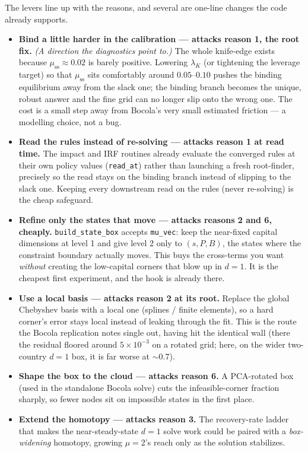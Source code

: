 \documentclass[11pt]{article}
\newcommand{\code}[1]{\texttt{#1}}
\begin{document}
The levers line up with the reasons, and several are one-line changes the
code already supports.

\begin{itemize}
\item \textbf{Bind a little harder in the calibration --- attacks reason 1,
      the root fix.} \emph{(A direction the diagnostics point to.)} The whole
      knife-edge exists because $\mu_{\text{ss}}\approx0.02$ is barely
      positive. Lowering $\lambda_K$ (or tightening the leverage target) so
      that $\mu_{\text{ss}}$ sits comfortably around $0.05$--$0.10$ pushes the
      binding equilibrium away from the slack one; the binding branch becomes
      the unique, robust answer and the fine grid can no longer slip onto the
      wrong one. The cost is a small step away from Bocola's very small
      estimated friction --- a modelling choice, not a bug.
\item \textbf{Read the rules instead of re-solving --- attacks reason 1 at
      read time.} The impact and IRF routines already evaluate the converged
      rules at their own policy values (\code{read\_at}) rather than launching
      a fresh root-finder, precisely so the read stays on the binding branch
      instead of slipping to the slack one. Keeping every downstream read on
      the rules (never re-solving) is the cheap safeguard.
\item \textbf{Refine only the states that move --- attacks reasons 2 and 6,
      cheaply.} \code{build\_state\_box} accepts \code{mu\_vec}: keep the
      near-fixed capital dimensions at level 1 and give level 2 only to
      $(s,P,B)$, the states where the constraint boundary actually moves. This
      buys the cross-terms you want \emph{without} creating the low-capital
      corners that blow up in $d=1$. It is the cheapest first experiment, and
      the hook is already there.
\item \textbf{Use a local basis --- attacks reason 2 at its root.} Replace the
      global Chebyshev basis with a local one (splines / finite elements), so
      a hard corner's error stays local instead of leaking through the fit.
      This is the route the Bocola replication notes single out, having hit
      the identical wall (there the residual floored around
      $5\times10^{-3}$ on a rotated grid; here, on the wider two-country
      $d=1$ box, it is far worse at $\sim0.7$).
\item \textbf{Shape the box to the cloud --- attacks reason 6.} A
      PCA-rotated box (used in the standalone Bocola solve) cuts the
      infeasible-corner fraction sharply, so fewer nodes sit on impossible
      states in the first place.
\item \textbf{Extend the homotopy --- attacks reason 3.} The recovery-rate
      ladder that makes the near-steady-state $d=1$ solve work could be paired
      with a \emph{box-widening} homotopy, growing $\mu=2$'s reach only as the
      solution stabilizes.
\end{itemize}
\end{document}
